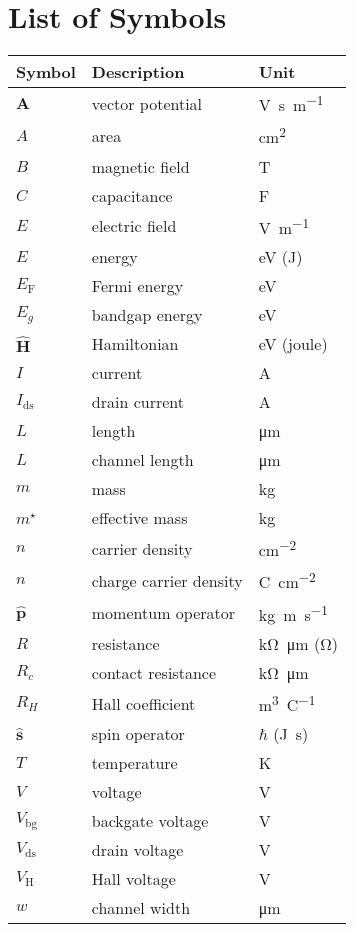 \chapter*{List of Symbols}
\begin{longtable}[l]{p{125pt} p{150pt} p{150pt}} 
\toprule
	\textbf{Symbol}	& \textbf{Description} & \textbf{Unit} \\ 
\midrule
	$\mathbf{A}$ & vector potential & \si{\volt\second\per\metre}\\
	$A$ & area & \si{\cm\squared}\\
	$B$ & magnetic field & \si{\tesla}\\
	$C$ & capacitance & \si{\farad}\\
	$E$ & electric field & \si{\volt\per\metre}\\
	$E$ & energy & \si{\electronvolt} (\si{\joule})\\
	$E_\mathrm{F}$  & Fermi energy & \si{\electronvolt}\\
	$E_g$ & bandgap energy & \si{\electronvolt}\\
	$\hat{\mathbf{H}}$ & Hamiltonian & \si{\electronvolt} (\si{joule})\\
	$I$ & current & \si{\ampere}\\
	$I_\mathrm{ds}$ & drain current & \si{\ampere}\\
	$L$ & length & \si{\micro\metre}\\
	$L$ & channel length & \si{\micro\metre}\\
	$m$ & mass & \si{\kg}\\
	$m^\star$ & effective mass & \si{\kg}\\
	$n$ & carrier density & \si{\cm\tothe{-2}}\\
	$n$ & charge carrier density & \si{\coulomb\cm\tothe{-2}}\\
	$\hat{\mathbf{p}}$ & momentum operator & \si{\kg\metre\per\second}\\
	$R$ & resistance & \si{\kilo\ohm\micro\metre} (\si{\ohm})\\
	$R_c$ & contact resistance & \si{\kilo\ohm\micro\metre}\\
	$R_H$ & Hall coefficient & \si{\metre\cubed\per\coulomb}\\
	$\hat{\mathbf{s}}$ & spin operator & $\hbar$ (\si{\joule\second})\\
	$T$ & temperature & \si{\kelvin}\\
	$V$ & voltage & \si{\volt}\\
	$V_\mathrm{bg}$ & backgate voltage & \si{\volt}\\
	$V_\mathrm{ds}$ & drain voltage & \si{\volt}\\
	$V_\mathrm{H}$ & Hall voltage & \si{\volt}\\
	$w$ & channel width & \si{\micro\metre}\\


\end{longtable}
